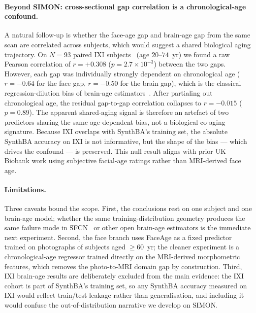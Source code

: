 \documentclass[11pt]{article}
\begin{document}
\paragraph{Beyond SIMON: cross-sectional gap correlation is a chronological-age confound.}
A natural follow-up is whether the face-age gap and brain-age gap from
the same scan are correlated across subjects, which would suggest a shared
biological aging trajectory.  On $N{=}93$ paired IXI subjects~\citep{ixi} (age
$20$--$74$~yr) we found a raw Pearson correlation of $r{=}{+}0.308$
($p{=}2.7{\times}10^{-3}$) between the two gaps.  However, each gap was
individually strongly dependent on chronological age ($r{=}{-}0.64$ for
the face gap, $r{=}{-}0.50$ for the brain gap), which is the classical
regression-dilution bias of brain-age estimators~\citep{smith2019brainage}.
After partialing out chronological age, the residual gap-to-gap
correlation collapses to $r{=}{-}0.015$ ($p{=}0.89$).  The apparent
shared-aging signal is therefore an artefact of two predictors sharing
the same age-dependent bias, not a biological co-aging signature.
Because IXI overlaps with SynthBA's training set, the absolute SynthBA
accuracy on IXI is not informative, but the shape of the bias --- which
drives the confound --- is preserved.  This null result aligns with
prior UK Biobank work using subjective facial-age ratings rather than
MRI-derived face age.

\paragraph{Limitations.}
Three caveats bound the scope.
First, the conclusions rest on one subject and one brain-age model; whether
the same training-distribution geometry produces the same failure mode in
SFCN~\citep{peng2021sfcn} or other open brain-age estimators is the
immediate next experiment.
Second, the face branch uses FaceAge as a fixed predictor trained on
photographs of subjects aged $\geq 60$~yr; the cleaner experiment is a
chronological-age regressor trained directly on the MRI-derived
morphometric features, which removes the photo-to-MRI domain gap by
construction.
Third, IXI brain-age results are deliberately excluded from the main
evidence: the IXI cohort is part of SynthBA's training set, so any
SynthBA accuracy measured on IXI would reflect train/test leakage rather
than generalisation, and including it would confuse the
out-of-distribution narrative we develop on SIMON.




\end{document}
